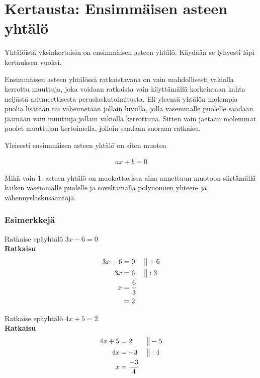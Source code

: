 \chapter{Kertausta: Ensimmäisen asteen yhtälö}

Yhtälöistä yksinkertaisin on ensimmäisen asteen yhtälö. Käydään se lyhyesti
läpi kertauksen vuoksi.

Ensimmäisen asteen yhtälössä ratkaistavana on vain mahdollisesti vakiolla
kerrottu muuttuja, joka voidaan ratkaista vain käyttämällä korkeintaan
kahta neljästä aritmeettisesta peruslaskutoimitusta. Eli yleensä
yhtälön molempia puolia lisätään tai vähennetään jollain luvulla, jolla
vasemmalle puolelle saadaan jäämään vain muuttuja jollain vakiolla kerrottuna.
Sitten vain jaetaan molemmat puolet muuttujan kertoimella, jolloin saadaan
suoraan ratkaisu.

Yleisesti ensimmäisen asteen yhtälö on siten muotoa

\begin{align*}
    ax + b = 0
\end{align*}

Mikä vain 1. asteen yhtälö on muokattavissa aina annettuun
muotoon siirtämällä kaiken vasemmalle puolelle ja
soveltamalla polynomien yhteen- ja vähennyslaskusääntöjä.

\subsection*{Esimerkkejä}

\begin{esimerkki}
Ratkaise epäyhtälö $3x - 6 = 0$ \\
\textbf{Ratkaisu} \\
  \begin{align*}
    3x - 6 &= 0 & \big\| & +6 \\
        3x &= 6 & \big\| & :3 \\
         x &= \frac{6}{3} \\
           &= 2
  \end{align*}
\end{esimerkki}

\begin{esimerkki}
Ratkaise epäyhtälö $4x + 5 = 2$ \\
\textbf{Ratkaisu}
\begin{align*}
    4x + 5 &= 2  & \big\| & -5 \\
        4x &= -3 & \big\| & :4 \\
         x &= \frac{-3}{4}
 \end{align*}
\end{esimerkki}

